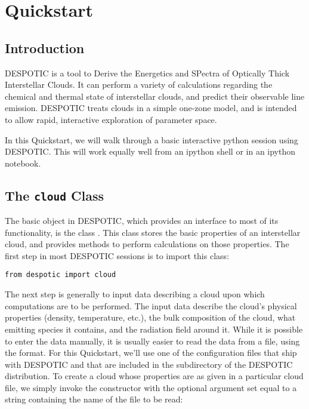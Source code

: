 \documentclass[letterpaper,10pt,english]{sphinxmanual}
\begin{document}
\chapter{Quickstart}
\label{quickstart::doc}\label{quickstart:quickstart}

\section{Introduction}
\label{quickstart:introduction}
DESPOTIC is a tool to Derive the Energetics and SPectra of
Optically Thick Interstellar Clouds. It can perform a
variety of calculations regarding the chemical and thermal state of
interstellar clouds, and predict their observable line
emission. DESPOTIC treats clouds in a simple one-zone model, and is
intended to allow rapid, interactive exploration of parameter space.

In this Quickstart, we will walk through a basic interactive python
session using DESPOTIC. This will work equally well from an ipython
shell or in an ipython notebook.


\section{The \texttt{cloud} Class}
\label{quickstart:the-cloud-class}
The basic object in DESPOTIC, which provides an interface to most of
its functionality, is the class . This class stores the basic
properties of an interstellar cloud, and provides methods to perform
calculations on those properties. The first step in most DESPOTIC
sessions is to import this class:

\begin{Verbatim}[commandchars=\\\{\}]
from despotic import cloud
\end{Verbatim}

The next step is generally to input data describing a cloud upon which
computations are to be performed. The input data describe the cloud's
physical properties (density, temperature, etc.), the bulk composition
of the cloud, what emitting species it contains, and the radiation
field around it. While it is possible to enter the data manually, it
is usually easier to read the data from a file, using the
{\hyperref[cloudfiles:sec\string-cloudfiles]{}} format. For this Quickstart, we'll use one of
the configuration files that ship with DESPOTIC and that are
included in the  subdirectory of the DESPOTIC
distribution. To create a cloud whose properties are as given in
a particular cloud file, we simply invoke the constructor with
the  optional argument set equal to a string containing
the name of the file to be read:
\end{document}
